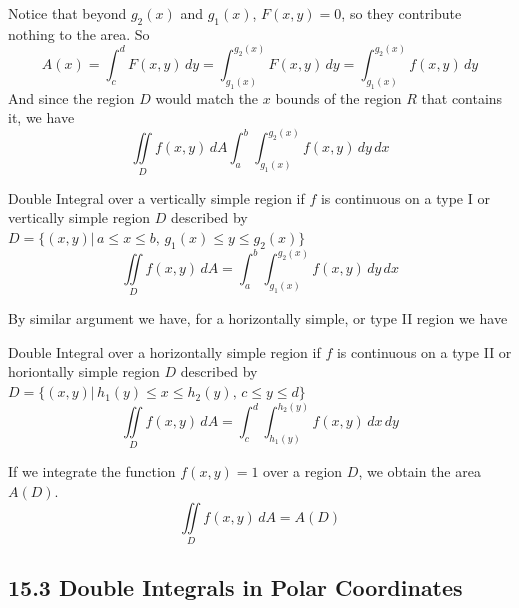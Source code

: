 \documentclass{article}
\begin{document}
	Notice that beyond $g_{2}(x)$ and $g_{1}(x)$, $F(x,y) = 0$, so they contribute
	nothing to the area. So
	\[
		A(x) = \int_{c}^{d}F(x,y) \, dy = \int_{g_1(x)}^{g_2(x)}F(x,y) \, dy = \int_{g_1(x)}
		^{g_2(x)}f(x,y) \, dy
	\]
	And since the region $D$ would match the $x$ bounds of the region $R$ that contains
	it, we have
	\[
		\iint\limits_{D} f(x,y) \,dA \int_{a}^{b}\int_{g_1(x)}^{g_2(x)}f(x,y) \, dy \,
		dx
	\]
	\begin{mybox}
		{Double Integral over a vertically simple region} if $f$ is continuous on a type
		I or vertically simple region $D$ described by $D = \{(x,y)|\, a \leq x \leq
		b, \, g_{1}(x) \leq y \leq g_{2}(x) \}$
		\[
			\iint\limits_{D} f(x,y) \,dA = \int_{a}^{b}\int_{g_1(x)}^{g_2(x)}f(x,y) \,
			dy \, dx
		\]
	\end{mybox}
	By similar argument we have, for a horizontally simple, or type II region we
	have
	\begin{mybox}
		{Double Integral over a horizontally simple region} if $f$ is continuous on a
		type II or horiontally simple region $D$ described by $D = \{(x,y)|\, h_{1}(y
		) \leq x \leq h_{2}(y), \, c \leq y \leq d \}$
		\[
			\iint\limits_{D} f(x,y) \,dA = \int_{c}^{d}\int_{h_1(y)}^{h_2(y)}f(x,y) \,
			dx \, dy
		\]
	\end{mybox}
	If we integrate the function $f(x,y) = 1$ over a region $D$, we obtain the area
	$A(D)$.
	\[
		\iint\limits_{D} f(x,y) \,dA = A(D)
	\]
	\subsection{15.3 Double Integrals in Polar Coordinates}
\end{document}
